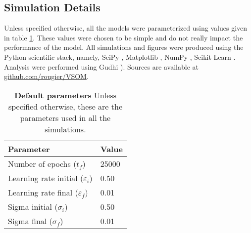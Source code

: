 \subsection{Simulation Details}

Unless specified otherwise, all the models were parameterized using values given in table \ref{table:parameters}. These values were chosen to be simple and do not really impact the performance of the model. All simulations and figures were produced using the Python scientific stack, namely, SciPy \citep{Jones:2001}, Matplotlib \citep{Hunter:2007}, NumPy \citep{Walt:2011}, Scikit-Learn \citep{Pedregosa:2011}. Analysis were performed using Gudhi \citep{Maria:2014}). 
Sources are available at \href{https://github.com/rougier/VSOM}{github.com/rougier/VSOM}.
\begin{table}[!ht]
  \begin{center}
    \begin{tabular}{ll}
        \textbf{Parameter} & \textbf{Value} \\
        \hline
        Number of epochs      ($t_f$)           & 25000\\
        Learning rate initial ($\varepsilon_i$) & 0.50\\
        Learning rate final   ($\varepsilon_f$) & 0.01\\
        Sigma initial         ($\sigma_i$)      & 0.50\\
        Sigma final           ($\sigma_f$)      & 0.01\\
    \end{tabular}
      \caption{\textbf{Default parameters} Unless specified otherwise, these are
        the parameters used in all the simulations.}
      \label{table:parameters}
  \end{center}
\end{table}



